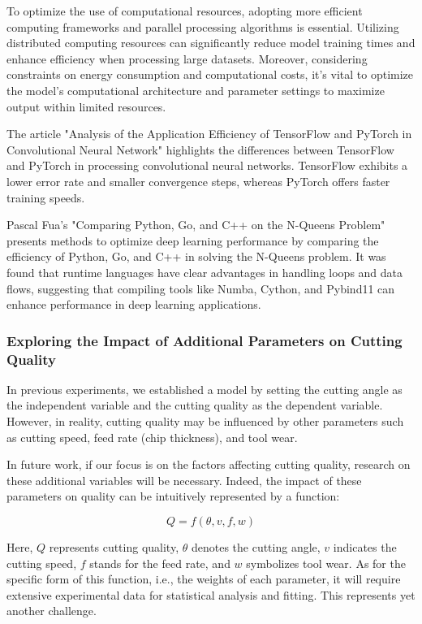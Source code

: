 To optimize the use of computational resources, adopting more efficient computing frameworks and parallel processing algorithms is essential. Utilizing distributed computing resources can significantly reduce model training times and enhance efficiency when processing large datasets. Moreover, considering constraints on energy consumption and computational costs, it's vital to optimize the model's computational architecture and parameter settings to maximize output within limited resources.

The article "Analysis of the Application Efficiency of TensorFlow and PyTorch in Convolutional Neural Network" highlights the differences between TensorFlow and PyTorch in processing convolutional neural networks\cite{6.2}. TensorFlow exhibits a lower error rate and smaller convergence steps, whereas PyTorch offers faster training speeds.

Pascal Fua's "Comparing Python, Go, and C++ on the N-Queens Problem" presents methods to optimize deep learning performance by comparing the efficiency of Python, Go, and C++ in solving the N-Queens problem.\cite{6.3} It was found that runtime languages have clear advantages in handling loops and data flows, suggesting that compiling tools like Numba, Cython, and Pybind11 can enhance performance in deep learning applications.




\subsubsection{Exploring the Impact of Additional Parameters on Cutting Quality}

In previous experiments, we established a model by setting the cutting angle as the independent variable and the cutting quality as the dependent variable. However, in reality, cutting quality may be influenced by other parameters such as cutting speed, feed rate (chip thickness), and tool wear.

In future work, if our focus is on the factors affecting cutting quality, research on these additional variables will be necessary. Indeed, the impact of these parameters on quality can be intuitively represented by a function:

\begin{equation}
Q = f(\theta, v, f, w)
\end{equation}

Here, $Q$ represents cutting quality, $\theta$ denotes the cutting angle, $v$ indicates the cutting speed, $f$ stands for the feed rate, and $w$ symbolizes tool wear. As for the specific form of this function, i.e., the weights of each parameter, it will require extensive experimental data for statistical analysis and fitting. This represents yet another challenge.

